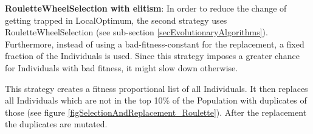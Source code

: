 \textbf{\Gls{RouletteWheelSelection} with elitism}: In order to reduce the change of getting trapped in \gls{LocalOptimum}, the second strategy uses \gls{RouletteWheelSelection} (see sub-section \ref{secEvolutionaryAlgorithms}). Furthermore, instead of using a bad-fitness-constant for the replacement, a fixed fraction of the \glspl{Individual} is used. Since this strategy imposes a greater chance for \glspl{Individual} with bad fitness, it might slow down otherwise.

This strategy creates a fitness proportional list of all \glspl{Individual}. It then replaces all \glspl{Individual} which are not in the top 10\% of the \gls{Population} with duplicates of those (see figure \ref{figSelectionAndReplacement_Roulette}). After the replacement the duplicates are mutated.

\begin{figure}[!ht]
	\centering

\end{figure}
